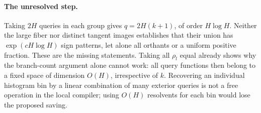 \documentclass[11pt]{article}
\begin{document}
\paragraph{The unresolved step.}
Taking $2H$ queries in each group gives $q=2H(k+1)$, of order
$H\log H$. Neither the large fiber nor distinct tangent images
establishes that their union has $\exp(cH\log H)$ sign patterns, let
alone all orthants or a uniform positive fraction. These are the
missing statements. Taking all $\rho_l$ equal already shows why the
branch-count argument alone cannot work: all query functions then
belong to a fixed space of dimension $O(H)$, irrespective of $k$.
Recovering an individual histogram bin by a linear combination of
many exterior queries is not a free operation in the local compiler;
using $O(H)$ resolvents for each bin would lose the proposed saving.
\end{document}
